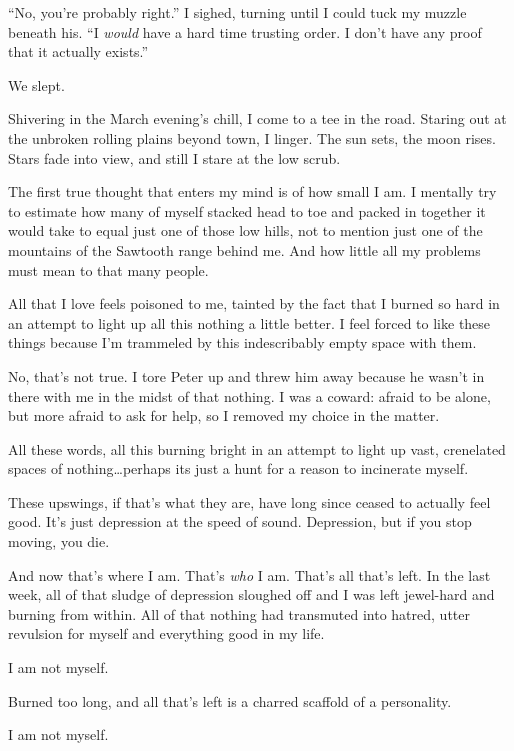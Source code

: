 ``No, you're probably right.'' I sighed, turning until I could tuck my muzzle beneath his. ``I \emph{would} have a hard time trusting order. I don't have any proof that it actually exists.''

We slept.

\secdiv{}

\noindent Shivering in the March evening's chill, I come to a tee in the road. Staring out at the unbroken rolling plains beyond town, I linger. The sun sets, the moon rises. Stars fade into view, and still I stare at the low scrub.

The first true thought that enters my mind is of how small I am. I mentally try to estimate how many of myself stacked head to toe and packed in together it would take to equal just one of those low hills, not to mention just one of the mountains of the Sawtooth range behind me. And how little all my problems must mean to that many people.

All that I love feels poisoned to me, tainted by the fact that I burned so hard in an attempt to light up all this nothing a little better. I feel forced to like these things because I'm trammeled by this indescribably empty space with them.

No, that's not true. I tore Peter up and threw him away because he wasn't in there with me in the midst of that nothing. I was a coward: afraid to be alone, but more afraid to ask for help, so I removed my choice in the matter.

All these words, all this burning bright in an attempt to light up vast, crenelated spaces of nothing\ldots{}perhaps its just a hunt for a reason to incinerate myself.

\secdiv{}

\noindent These upswings, if that's what they are, have long since ceased to actually feel good. It's just depression at the speed of sound. Depression, but if you stop moving, you die.

And now that's where I am. That's \emph{who} I am. That's all that's left. In the last week, all of that sludge of depression sloughed off and I was left jewel-hard and burning from within. All of that nothing had transmuted into hatred, utter revulsion for myself and everything good in my life.

I am not myself.

Burned too long, and all that's left is a charred scaffold of a personality.

I am not myself.

